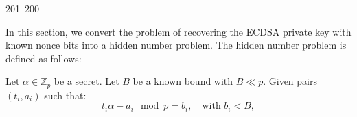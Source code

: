 201~200~\documentclass{article}
\begin{document}
	                                                                        	                                                                    	                                	                    	                    	                        	                        	                    	                                                                	                	                                                                    	                    In this section, we convert the problem of recovering the ECDSA private key with known nonce bits into a hidden number problem. The hidden number problem is defined as follows:

	                                                                        	                                                                    	                                	                    	                    	                        	                        	                    	                                                                	                	                                                                    	                    Let $\alpha \in \mathbb{Z}_p$ be a secret. Let $B$ be a known bound with $B \ll p$. Given pairs $(t_i, a_i)$ such that:
	                                                                        	                                                                    	                                	                    	                    	                        	                        	                    	                                                                	                	                                                                    	                    \[
	                                                                        	                                                                    	                                	                    	                    	                        	                        	                    	                                                                	                	                                                                    	                    	t_i \alpha - a_i \mod p = b_i, \quad \text{with } b_i < B,
	                                                                        	                                                                    	                                	                    	                    	                        	                        	                    	                                                                	                	                                                                    	                    	\]
\end{document}
